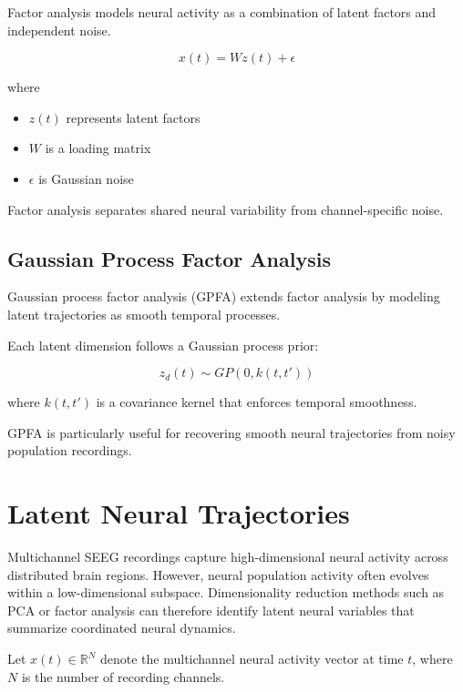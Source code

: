 \documentclass[11pt]{report}
\begin{document}
Factor analysis models neural activity as a combination of latent
factors and independent noise.

\begin{equation}
x(t) = W z(t) + \epsilon
\end{equation}

where

\begin{itemize}
\item $z(t)$ represents latent factors
\item $W$ is a loading matrix
\item $\epsilon$ is Gaussian noise
\end{itemize}

Factor analysis separates shared neural variability from
channel-specific noise.

\section{Gaussian Process Factor Analysis}

Gaussian process factor analysis (GPFA) extends factor analysis
by modeling latent trajectories as smooth temporal processes.

Each latent dimension follows a Gaussian process prior:

\begin{equation}
z_d(t) \sim GP(0, k(t,t'))
\end{equation}

where $k(t,t')$ is a covariance kernel that enforces temporal
smoothness.

GPFA is particularly useful for recovering smooth neural trajectories
from noisy population recordings.


\chapter{Latent Neural Trajectories}

Multichannel SEEG recordings capture high-dimensional neural activity
across distributed brain regions. However, neural population activity
often evolves within a low-dimensional subspace. Dimensionality
reduction methods such as PCA or factor analysis can therefore
identify latent neural variables that summarize coordinated neural
dynamics.

Let $x(t) \in \mathbb{R}^{N}$ denote the multichannel neural activity
vector at time $t$, where $N$ is the number of recording channels.
\end{document}
